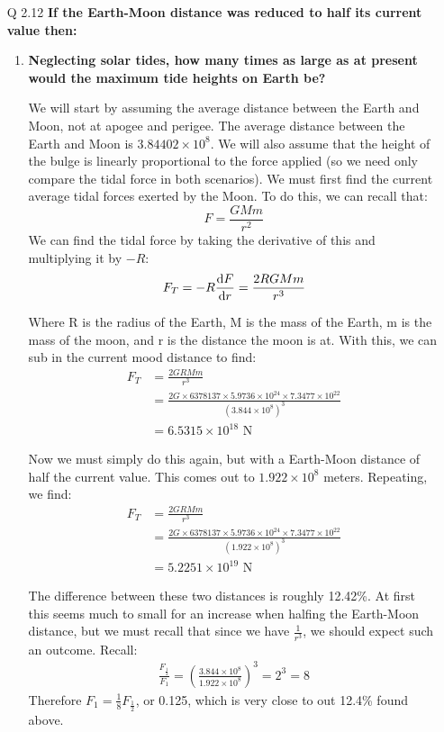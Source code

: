 \documentclass[11pt]{article}
\begin{document}
\begin{enumerate}
		
		
		\newpage
		\item [Q 2.12] \textbf{If the Earth-Moon distance was reduced to half its current value then: }
		\begin{enumerate}
			\item \textbf{Neglecting solar tides, how many times as large as at present would the maximum tide heights on Earth be?}
			
			We will start by assuming the average distance between the Earth and Moon, not at apogee and perigee. The average distance between the Earth and Moon is $3.84402\times 10^8$. We will also assume that the height of the bulge is linearly proportional to the force applied (so we need only compare the tidal force in both scenarios). We must first find the current average tidal forces exerted by the Moon. To do this, we can recall that:
			\[ F = \frac{GMm}{r^2} \]
			We can find the tidal force by taking the derivative of this and multiplying it by $-R$:
			\[ F_T = -R \dv{F}{r} = \frac{2RGMm}{r^3} \]
			
			Where R is the radius of the Earth, M is the mass of the Earth, m is the mass of the moon, and r is the distance the moon is at. With this, we can sub in the current mood distance to find:
			\begin{align*}
				F_T &= \frac{2GRMm}{r^3} \\
				&= \frac{2G \times 6378137 \times 5.9736 \times 10^{24} \times 7.3477 \times 10^{22}}{(3.844 \times 10^8)^3} \\
				&= 6.5315 \times 10^{18} \text{ N}
			\end{align*}
			
			Now we must simply do this again, but with a Earth-Moon distance of half the current value. This comes out to $1.922 \times 10^8$ meters. Repeating, we find:
			\begin{align*}
			F_T &= \frac{2GRMm}{r^3} \\
			&= \frac{2G \times 6378137 \times 5.9736 \times 10^{24} \times 7.3477 \times 10^{22}}{(1.922 \times 10^8)^3} \\
			&= 5.2251 \times 10^{19} \text{ N}
			\end{align*}
			
			The difference between these two distances is roughly 12.42\%. At first this seems much to small for an increase when halfing the Earth-Moon distance, but we must recall that since we have $\frac{1}{r^3}$, we should expect such an outcome. Recall:
			\begin{align*}
				\frac{F_\frac{1}{2}}{F_1} = \left( \frac{3.844 \times 10^8}{1.922 \times 10^8}\right)^3 = 2^3 = 8
			\end{align*}
			Therefore $F_1 = \frac{1}{8} F_\frac{1}{2}$, or 0.125, which is very close to out 12.4\% found above.
			

\end{enumerate}
\end{enumerate}
\end{document}
